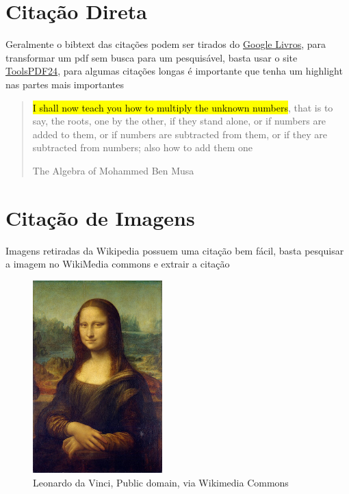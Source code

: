 \documentclass{article}
\newcommand{\highlight}[1]{{\sethlcolor{yellow}\hl{#1}}}
\begin{document}
\newpage
\tableofcontents
\listoffigures

\newpage

\section{Citação Direta}
Geralmente o bibtext das citações
podem ser tirados do \href{https://www.books.google.com.br}{Google Livros}, para
transformar um pdf sem busca para um pesquisável, basta usar o site
\hyperlink{tools.pdf24.org/pt/ocr-pdf}{ToolsPDF24}, para algumas
citações longas é importante que tenha um highlight nas partes mais importantes

\begin{quotation}
    \highlight{I shall now teach you how to multiply the unknown
    numbers}, that is to say, the roots, one by the other, if
    they stand alone, or if numbers are added to them, or if
    numbers are subtracted from them, or if they are subtracted 
    from numbers; also how to add them one
    \begin{flushright}
        The Algebra of Mohammed Ben Musa\cite[p. 30]{khuwarizmi2022algebra} 
      \end{flushright}
    \end{quotation}


\section{Citação de Imagens}
Imagens retiradas da Wikipedia possuem uma citação bem fácil, basta pesquisar a 
imagem no WikiMedia commons e extrair a citação 

\begin{figure}[H]
    \centering
    \includegraphics[width=50mm]{../images/monalisa.jpg}
    \caption{Leonardo da Vinci, Public domain, via Wikimedia Commons}
\end{figure}
\end{document}

